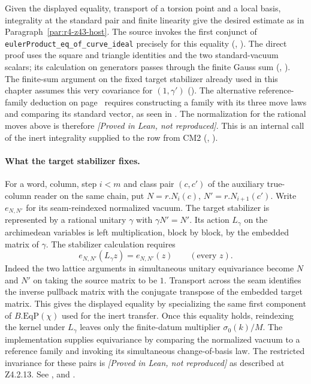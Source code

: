 Given the displayed equality, transport of a torsion point and a
local basis, integrality at the standard pair and finite linearity
give the desired estimate as in Paragraph~\ref{par:r4-z43-host}.
The source invokes the first conjunct of
\nolinkurl{eulerProduct_eq_of_curve_ideal} precisely for this equality
(,
). The direct proof uses
the square and triangle identities and the two standard-vacuum
scalars; its calculation on generators passes through the finite Gauss
sum (,
).
The finite-sum argument on the fixed target stabilizer already used in
this chapter assumes this very covariance for $(1,\gamma')$
().
The alternative reference-family deduction on
page~\pageref{r8:Z4.2.13} requires constructing a family with its three
move laws and comparing its standard vector, as seen in
.
The normalization for the rational moves above is therefore
\emph{[Proved in Lean, not reproduced]}.
This is an internal call of the inert integrality supplied to the
row from CM2 (,
).

\paragraph{What the target stabilizer fixes.}
For a word, column, step $i<m$ and class pair $(c,c')$ of the auxiliary true-column reader on the same chain, put $N=r.N_i(c)$, $N'=r.N_{i+1}(c')$. Write $e_{N,N'}$ for its seam-reindexed normalized vacuum. The target stabilizer is represented by a rational unitary $\gamma$ with $\gamma N'=N'$. Its action $L_\gamma$ on the archimedean variables is left multiplication, block by block, by the embedded matrix of $\gamma$. The stabilizer calculation requires
\[
             e_{N,N'}(L_\gamma z)=e_{N,N'}(z)\qquad(\text{every }z).
\]
Indeed the two lattice arguments in simultaneous unitary equivariance become $N$ and $N'$ on taking the source matrix to be $1$. Transport across the seam identifies the inverse pullback matrix with the conjugate transpose of the embedded target matrix. This gives the displayed equality by specializing the same first component of $B.\mathrm{EqP}(\chi)$ used for the inert transfer. Once this equality holds, reindexing the kernel under $L_\gamma$ leaves only the finite-datum multiplier $\sigma_0(k)/M$. The implementation supplies equivariance by comparing the normalized vacuum to a reference family and invoking its simultaneous change-of-basis law. The restricted invariance for these pairs is \emph{[Proved in Lean, not reproduced]} as described at Z4.2.13.
See ,  and .

